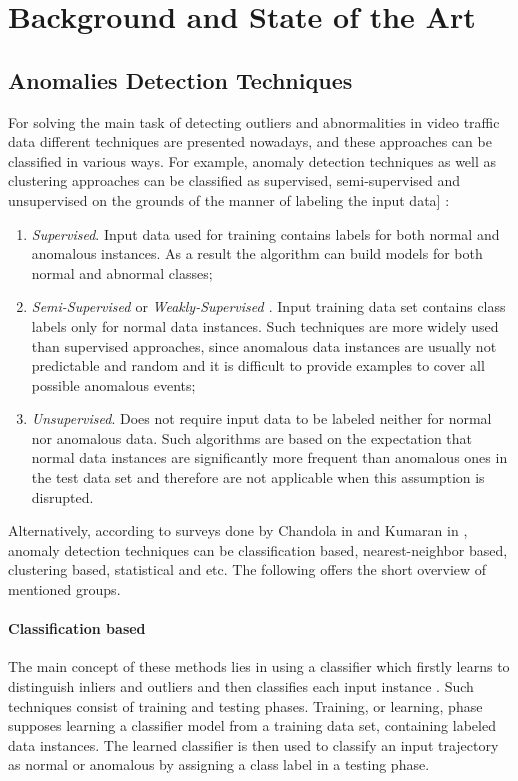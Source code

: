 \chapter{Background and State of the Art}
\label{ch:Background and State of the Art}

\section{Anomalies Detection Techniques}
For solving the main task of detecting outliers and abnormalities in video traffic data different techniques are presented nowadays, and these approaches can be classified in various ways.
For example, anomaly detection techniques as well as clustering approaches can be classified as supervised, semi-supervised and unsupervised on the grounds of the manner of labeling the input data] \cite{article:15_survey_ad}:
\begin{enumerate}
	\item \textit{Supervised}. Input data used for training contains labels for both normal and anomalous instances. As a result the algorithm can build models for both normal and abnormal classes;
	\item \textit{Semi-Supervised \cite{article:15_survey_ad}} or \textit{Weakly-Supervised \cite{article:5_survey_tbsa}}. Input training data set contains class labels only for normal data instances. Such techniques are more widely used than supervised approaches, since anomalous data instances are usually not predictable and random and it is difficult to provide examples to cover all possible anomalous events;
	\item \textit{Unsupervised}. Does not require input data to be labeled neither for normal nor anomalous data. Such algorithms are based on the expectation that normal data instances are significantly more frequent than anomalous ones in the test data set and therefore are not applicable when this assumption is disrupted.
\end{enumerate}

Alternatively, according to surveys done by Chandola in \cite{article:15_survey_ad} and Kumaran in \cite{article:6_survey_anom_det_rtuvs}, anomaly detection techniques can be classification based, nearest-neighbor based, clustering based, statistical and etc. The following offers the short overview of mentioned groups.

\subsubsection{Classification based}
The main concept of these methods lies in using a classifier which firstly learns to distinguish inliers and outliers and then classifies each input instance \cite{inproceedings:18_ardod_lstd}. Such techniques consist of training and testing phases. Training, or learning, phase supposes learning a classifier model from a training data set, containing labeled data instances. The learned classifier is then used to classify an input trajectory as normal or anomalous by assigning a class label in a testing phase.

